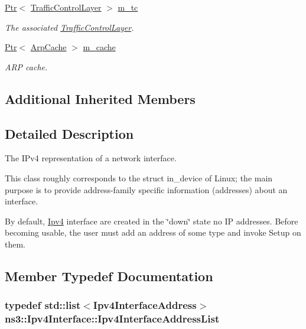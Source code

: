 \begin{DoxyCompactItemize}
\hyperlink{classns3_1_1Ptr}{Ptr}$<$ \hyperlink{classns3_1_1TrafficControlLayer}{Traffic\+Control\+Layer} $>$ \hyperlink{classns3_1_1Ipv4Interface_a41ba88695bd05ab856a01d2e5ce556c3}{m\+\_\+tc}
\begin{DoxyCompactList}\small\item\em The associated \hyperlink{classns3_1_1TrafficControlLayer}{Traffic\+Control\+Layer}. \end{DoxyCompactList}\item 
\hyperlink{classns3_1_1Ptr}{Ptr}$<$ \hyperlink{classns3_1_1ArpCache}{Arp\+Cache} $>$ \hyperlink{classns3_1_1Ipv4Interface_aaa47d6f2baff7747e75e36dac7e83438}{m\+\_\+cache}
\begin{DoxyCompactList}\small\item\em A\+RP cache. \end{DoxyCompactList}\end{DoxyCompactItemize}
\subsection*{Additional Inherited Members}


\subsection{Detailed Description}
The I\+Pv4 representation of a network interface. 

This class roughly corresponds to the struct in\+\_\+device of Linux; the main purpose is to provide address-\/family specific information (addresses) about an interface.

By default, \hyperlink{classns3_1_1Ipv4}{Ipv4} interface are created in the \char`\"{}down\char`\"{} state no IP addresses. Before becoming usable, the user must add an address of some type and invoke Setup on them. 

\subsection{Member Typedef Documentation}
\subsubsection[{\texorpdfstring{Ipv4\+Interface\+Address\+List}{Ipv4InterfaceAddressList}}]{\setlength{\rightskip}{0pt plus 5cm}typedef {\bf std\+::list}$<${\bf Ipv4\+Interface\+Address}$>$ {\bf ns3\+::\+Ipv4\+Interface\+::\+Ipv4\+Interface\+Address\+List}\hspace{0.3cm}{\ttfamily [private]}}\hypertarget{classns3_1_1Ipv4Interface_aee3862b3d3b286dd3c950fdc0c8c9420}{}\label{classns3_1_1Ipv4Interface_aee3862b3d3b286dd3c950fdc0c8c9420}


